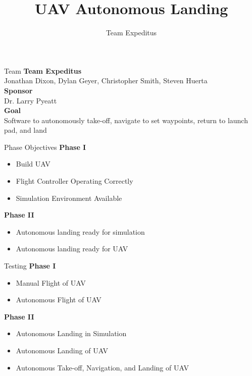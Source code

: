 \documentclass[11pt]{beamer}
\author{Team Expeditus}
\title{UAV Autonomous Landing}
\institute{Dept. of Computer Science, SDSMT}
\begin{document}
\begin{frame}
\titlepage
\end{frame}


\begin{frame}{Team}
\textbf{Team Expeditus}\\
Jonathan Dixon, Dylan Geyer, Christopher Smith, Steven Huerta\\ 
\vspace{6mm}
\textbf{Sponsor}\\
Dr. Larry Pyeatt\\
\vspace{6mm}
\textbf{Goal}\\
Software to autonomously take-off, navigate to set waypoints, return to launch pad, and land
\end{frame}

\begin{frame}{Phase Objectives}
\textbf{Phase I}
\begin{itemize}
\item Build UAV 
\item Flight Controller Operating Correctly
\item Simulation Environment Available
\end{itemize}
\vspace{5mm}
\textbf{Phase II}
\begin{itemize}
\item Autonomous landing ready for simulation
\item Autonomous landing ready for UAV
\end{itemize}
\end{frame}

\begin{frame}{Testing}
\textbf{Phase I}
\begin{itemize}
\item Manual Flight of UAV
\item Autonomous Flight of UAV 
\end{itemize}
\vspace{5mm}
\textbf{Phase II}
\begin{itemize}
\item Autonomous Landing in Simulation
\item Autonomous Landing of UAV
\item Autonomous Take-off, Navigation, and Landing of UAV
\end{itemize}
\end{frame}
\end{document}
